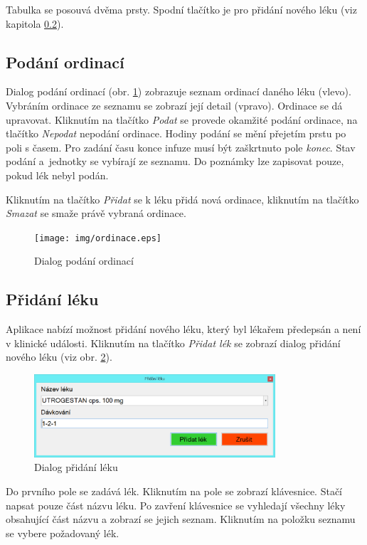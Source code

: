 Tabulka se posouvá dvěma prsty. Spodní tlačítko je pro přidání nového léku (viz kapitola \ref{sec:pridat_lek}).

\subsection{Podání ordinací}
\label{sec:ordinace}

Dialog podání ordinací (obr. \ref{fig:ordinace}) zobrazuje seznam ordinací daného léku (vlevo). Vybráním ordinace ze seznamu se zobrazí její detail (vpravo). Ordinace se dá upravovat. Kliknutím na tlačítko \emph{Podat} se provede okamžité podání ordinace, na tlačítko \emph{Nepodat} nepodání ordinace. Hodiny podání se mění přejetím prstu po poli s časem. Pro zadání času konce infuze musí být zaškrtnuto pole \emph{konec}. Stav podání a~jednotky se vybírají ze seznamu. Do poznámky lze zapisovat pouze, pokud lék nebyl podán.

Kliknutím na tlačítko \emph{Přidat} se k léku přidá nová ordinace, kliknutím na tlačítko \emph{Smazat} se smaže právě vybraná ordinace.

\begin{figure}[H]
	\centering
	\texttt{[image: img/ordinace.eps]}
	\caption{Dialog podání ordinací}
  \label{fig:ordinace}
\end{figure}


\subsection{Přidání léku}
\label{sec:pridat_lek}

Aplikace nabízí možnost přidání nového léku, který byl lékařem předepsán a není v klinické události. Kliknutím na tlačítko \emph{Přidat lék} se zobrazí dialog přidání nového léku (viz obr. \ref{fig:pridat_lek}).

\begin{figure}[H]
	\centering
	\includegraphics[width=0.8\textwidth]{img/medikace_pridat_lek.eps}
	\caption{Dialog přidání léku}
  \label{fig:pridat_lek}
\end{figure}

Do prvního pole se zadává lék. Kliknutím na pole se zobrazí klávesnice. Stačí napsat pouze část názvu léku. Po zavření klávesnice se vyhledají všechny léky obsahující část názvu a zobrazí se jejich seznam. Kliknutím na položku seznamu se vybere požadovaný lék.

